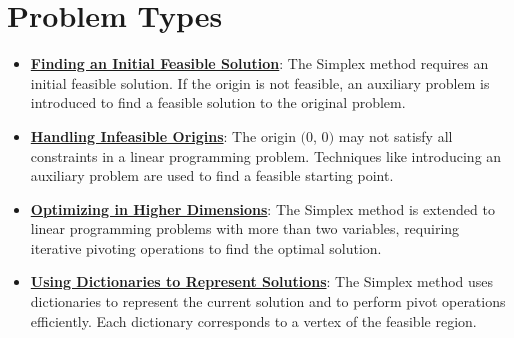 \documentclass{article}%
\begin{document}
\section{Problem Types}%
\label{sec:ProblemTypes}%
\begin{itemize}[leftmargin=*]%
\item \href{https://www.math.purdue.edu/~yipn/421/2024-08-27-ExSimplex.pdf#page=32}{\textbf{Finding an Initial Feasible Solution}}: The Simplex method requires an initial feasible solution. If the origin is not feasible, an auxiliary problem is introduced to find a feasible solution to the original problem.%
\item \href{https://www.math.purdue.edu/~yipn/421/2024-08-27-ExSimplex.pdf#page=30}{\textbf{Handling Infeasible Origins}}: The origin $($0, 0$)$ may not satisfy all constraints in a linear programming problem. Techniques like introducing an auxiliary problem are used to find a feasible starting point.%
\item \href{https://www.math.purdue.edu/~yipn/421/2024-08-27-ExSimplex.pdf#page=17}{\textbf{Optimizing in Higher Dimensions}}: The Simplex method is extended to linear programming problems with more than two variables, requiring iterative pivoting operations to find the optimal solution.%
\item \href{https://www.math.purdue.edu/~yipn/421/2024-08-27-ExSimplex.pdf#page=26}{\textbf{Using Dictionaries to Represent Solutions}}: The Simplex method uses dictionaries to represent the current solution and to perform pivot operations efficiently. Each dictionary corresponds to a vertex of the feasible region.%
\end{itemize}%
\end{document}
